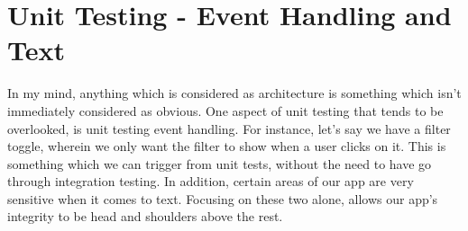 \maketitle{}
\section{ Unit Testing - Event Handling and Text}
In my mind, anything which is considered as architecture is something which
isn't immediately considered as obvious. One aspect of unit testing that tends
to be overlooked, is unit testing event handling. For instance, let's say we
have a filter toggle, wherein we only want the filter to show when a user clicks
on it. This is something which we can trigger from unit tests, without the need
to have go through integration testing. In addition, certain areas of our app
are very sensitive when it comes to text. Focusing on these two alone, allows
our app's integrity to be head and shoulders above the rest.
